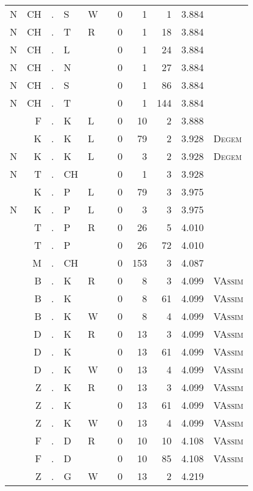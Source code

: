 \begin{longtable}{r@{ } r@{ } c@{ } l@{ } l@{ } l@{ } r r r r l }
N & CH & . & S & W &   & 0 & 1 & 1 & 3.884 &  \\
N & CH & . & T & R &   & 0 & 1 & 18 & 3.884 &  \\
N & CH & . & L &   &   & 0 & 1 & 24 & 3.884 &  \\
N & CH & . & N &   &   & 0 & 1 & 27 & 3.884 &  \\
N & CH & . & S &   &   & 0 & 1 & 86 & 3.884 &  \\
N & CH & . & T &   &   & 0 & 1 & 144 & 3.884 &  \\
  & F & . & K & L &   & 0 & 10 & 2 & 3.888 &  \\
  & K & . & K & L &   & 0 & 79 & 2 & 3.928 & \textsc{Degem} \\
N & K & . & K & L &   & 0 & 3 & 2 & 3.928 & \textsc{Degem} \\
N & T & . & CH &   &   & 0 & 1 & 3 & 3.928 &  \\
  & K & . & P & L &   & 0 & 79 & 3 & 3.975 &  \\
N & K & . & P & L &   & 0 & 3 & 3 & 3.975 &  \\
  & T & . & P & R &   & 0 & 26 & 5 & 4.010 &  \\
  & T & . & P &   &   & 0 & 26 & 72 & 4.010 &  \\
  & M & . & CH &   &   & 0 & 153 & 3 & 4.087 &  \\
  & B & . & K & R &   & 0 & 8 & 3 & 4.099 & \textsc{VAssim} \\
  & B & . & K &   &   & 0 & 8 & 61 & 4.099 & \textsc{VAssim} \\
  & B & . & K & W &   & 0 & 8 & 4 & 4.099 & \textsc{VAssim} \\
  & D & . & K & R &   & 0 & 13 & 3 & 4.099 & \textsc{VAssim} \\
  & D & . & K &   &   & 0 & 13 & 61 & 4.099 & \textsc{VAssim} \\
  & D & . & K & W &   & 0 & 13 & 4 & 4.099 & \textsc{VAssim} \\
  & Z & . & K & R &   & 0 & 13 & 3 & 4.099 & \textsc{VAssim} \\
  & Z & . & K &   &   & 0 & 13 & 61 & 4.099 & \textsc{VAssim} \\
  & Z & . & K & W &   & 0 & 13 & 4 & 4.099 & \textsc{VAssim} \\
  & F & . & D & R &   & 0 & 10 & 10 & 4.108 & \textsc{VAssim} \\
  & F & . & D &   &   & 0 & 10 & 85 & 4.108 & \textsc{VAssim} \\
  & Z & . & G & W &   & 0 & 13 & 2 & 4.219 &  \\

\end{longtable}
